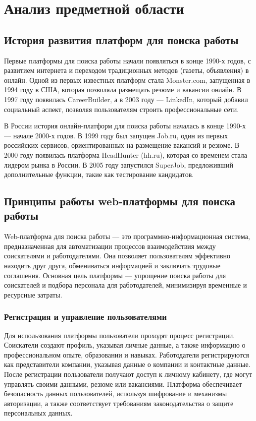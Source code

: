 \section{Анализ предметной области}

\subsection{История развития платформ для поиска работы}

Первые платформы для поиска работы начали появляться в конце 1990-х годов, с развитием интернета и переходом традиционных методов (газеты, объявления) в онлайн. Одной из первых известных платформ стала Monster.com, запущенная в 1994 году в США, которая позволяла размещать резюме и вакансии онлайн. В 1997 году появилась CareerBuilder, а в 2003 году — LinkedIn, который добавил социальный аспект, позволяя пользователям строить профессиональные сети.

В России история онлайн-платформ для поиска работы началась в конце 1990-х — начале 2000-х годов. В 1999 году был запущен Job.ru, один из первых российских сервисов, ориентированных на размещение вакансий и резюме. В 2000 году появилась платформа HeadHunter (hh.ru), которая со временем стала лидером рынка в России. В 2005 году запустился SuperJob, предложивший дополнительные функции, такие как тестирование кандидатов.

\subsection{Принципы работы web-платформы для поиска работы}

Web-платформа для поиска работы — это программно-информационная система, предназначенная для автоматизации процессов взаимодействия между соискателями и работодателями. Она позволяет пользователям эффективно находить друг друга, обмениваться информацией и заключать трудовые соглашения. Основная цель платформы — упрощение поиска работы для соискателей и подбора персонала для работодателей, минимизируя временные и ресурсные затраты.

\subsubsection{Регистрация и управление пользователями}

Для использования платформы пользователи проходят процесс регистрации. Соискатели создают профиль, указывая личные данные, а также информацию о профессиональном опыте, образовании и навыках. Работодатели регистрируются как представители компании, указывая данные о компании и контактные данные. После регистрации пользователи получают доступ к личному кабинету, где могут управлять своими данными, резюме или вакансиями. Платформа обеспечивает безопасность данных пользователей, используя шифрование и механизмы авторизации, а также соответствует требованиям законодательства о защите персональных данных.

